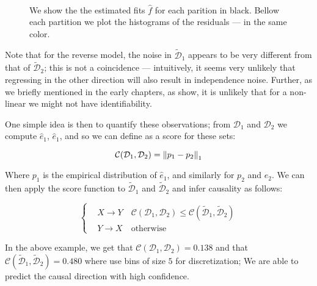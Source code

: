 \begin{figure}[H]
    \captionsetup[subfigure]{labelformat=empty}
    \centering
    \\


    \caption{  We show the the estimated fits $\hat{f}$ for each parition in black. Bellow each 
    partition we plot the histograms of the residuals ---  in the same color. }
    \label{fig:algo_fit}
\end{figure}

Note that for the reverse model, the noise in $\mathcal{\tilde{D}}_1$ appears to be very different from 
that of $\mathcal{\tilde{D}}_2$; this is not a coincidence ---  intuitively, it seems very unlikely that 
regressing in the other direction will also result in independence noise. Further, as we briefly 
mentioned in the early chapters, as \cite{hoyer2009nonlinear} show, it is unlikely that for a non-linear 
we might not have identifiability. 

One simple idea is then to quantify these observations; from $\mathcal{D}_1$ and $\mathcal{D}_2$ we 
compute $\hat{e}_1$, $\hat{e}_1$, and so we can define as a score for these sets:

$$
     \mathcal{C}(\mathcal{D}_1, \mathcal{D}_2) = \left\lVert p_1 - p_2\right\rVert_1
$$

Where $p_1$ is the empirical distribution of $\hat{e}_1$, and similarly for $p_2$ and $\hat{e}_2$. We 
can then apply the score function to $\mathcal{\tilde{D}}_1$ and $\mathcal{\tilde{D}}_2$ and 
infer causality as follows:

\[ 
     \begin{cases} 
        & X \rightarrow Y \quad  \mathcal{C}(\mathcal{D}_1, \mathcal{D}_2) 
        \leq \mathcal{C}(\mathcal{\tilde{D}}_1, \mathcal{\tilde{D}}_2) \\
        & Y \rightarrow X \quad \text{otherwise}
     \end{cases}
\]

In the above example, we get that $\mathcal{C}(\mathcal{D}_1, \mathcal{D}_2) = 0.138$ and that
$\mathcal{C}(\mathcal{\tilde{D}}_1, \mathcal{\tilde{D}}_2) = 0.480$ where use bins of size $5$ 
for discretization; We are able to predict the causal direction with high confidence.

